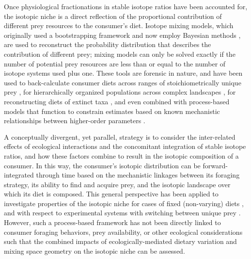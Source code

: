 \documentclass{frontiersSCNS}
\begin{document}
Once physiological fractionations in stable isotope ratios have been accounted for, the isotopic niche is a direct reflection of the proportional contribution of different prey resources to the consumer's diet.
Isotope mixing models, which originally used a bootstrapping framework \citep{Phillips:2003kq,Phillips:2005p1007} and now employ Bayesian methods \citep{Moore:2008kg,Parnell:2010ub,Hopkins:2012dza,Parnell:2012wv}, are used to reconstruct the probability distribution that describes the contribution of different prey; mixing models can only be solved exactly if the number of potential prey resources are less than or equal to the number of isotope systems used plus one.
These tools are forensic in nature, and have been used to back-calculate consumer diets across ranges of stoichiometrically unique prey \citep{Hopkins:2015ip}, for hierarchically organized populations across complex landscapes \citep{Semmens:2009uq}, for reconstructing diets of extinct taxa \citep{Yeakel:2012uc}, and even combined with process-based models that function to constrain estimates based on known mechanistic relationships between higher-order parameters \citep{Ogle:2014jg}.


A conceptually divergent, yet parallel, strategy is to consider the inter-related effects of ecological interactions and the concomitant integration of stable isotope ratios, and how these factors combine to result in the isotopic composition of a consumer.
In this way, the consumer's isotopic distribution can be forward-integrated through time based on the mechanistic linkages between its foraging strategy, its ability to find and acquire prey, and the isotopic landscape over which its diet is composed.
This general perspective has been applied to investigate properties of the isotopic niche for cases of fixed (non-varying) diets \citep{Araujo:2007iua,Araujo:2009p2286}, and with respect to experimental systems with switching between unique prey \citep{Fink:2012eg}.
However, such a process-based framework has not been directly linked to consumer foraging behaviors, prey availability, or other ecological considerations such that the combined impacts of ecologically-mediated dietary variation and mixing space geometry on the isotopic niche can be assessed.



\end{document}
